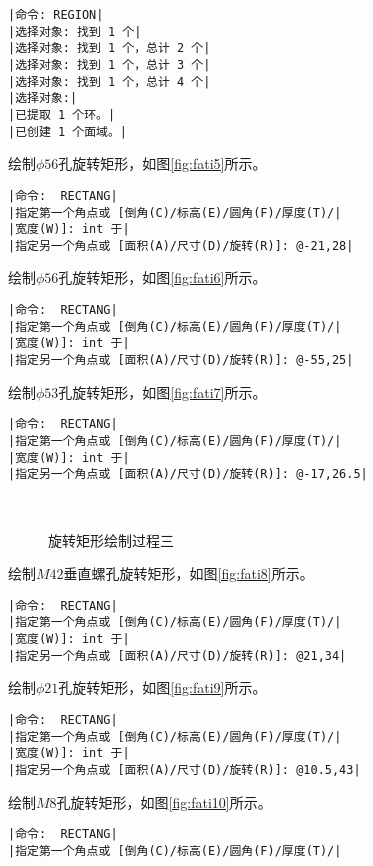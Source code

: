 \begin{procedure}
\begin{lstlisting}
|命令: REGION|
|选择对象: 找到 1 个|
|选择对象: 找到 1 个，总计 2 个|
|选择对象: 找到 1 个，总计 3 个|
|选择对象: 找到 1 个，总计 4 个|
|选择对象:|
|已提取 1 个环。|
|已创建 1 个面域。|
\end{lstlisting}
绘制$\phi 56$孔旋转矩形，如图\ref{fig:fati5}所示。
\begin{lstlisting}
|命令:  RECTANG|
|指定第一个角点或 [倒角(C)/标高(E)/圆角(F)/厚度(T)/|
|宽度(W)]: int 于|
|指定另一个角点或 [面积(A)/尺寸(D)/旋转(R)]: @-21,28|
\end{lstlisting}
绘制$\phi 56$孔旋转矩形，如图\ref{fig:fati6}所示。
\begin{lstlisting}
|命令:  RECTANG|
|指定第一个角点或 [倒角(C)/标高(E)/圆角(F)/厚度(T)/|
|宽度(W)]: int 于|
|指定另一个角点或 [面积(A)/尺寸(D)/旋转(R)]: @-55,25|
\end{lstlisting}
绘制$\phi 53$孔旋转矩形，如图\ref{fig:fati7}所示。
\begin{lstlisting}
|命令:  RECTANG|
|指定第一个角点或 [倒角(C)/标高(E)/圆角(F)/厚度(T)/|
|宽度(W)]: int 于|
|指定另一个角点或 [面积(A)/尺寸(D)/旋转(R)]: @-17,26.5|
\end{lstlisting}
\begin{figure}[htbp]
\centering
{}\hspace{30pt}
\\
\hspace{30pt}
\caption{旋转矩形绘制过程三}
\end{figure}
绘制$M42$垂直螺孔旋转矩形，如图\ref{fig:fati8}所示。
\begin{lstlisting}
|命令:  RECTANG|
|指定第一个角点或 [倒角(C)/标高(E)/圆角(F)/厚度(T)/|
|宽度(W)]: int 于|
|指定另一个角点或 [面积(A)/尺寸(D)/旋转(R)]: @21,34|
\end{lstlisting}
绘制$\phi 21$孔旋转矩形，如图\ref{fig:fati9}所示。
\begin{lstlisting}
|命令:  RECTANG|
|指定第一个角点或 [倒角(C)/标高(E)/圆角(F)/厚度(T)/|
|宽度(W)]: int 于|
|指定另一个角点或 [面积(A)/尺寸(D)/旋转(R)]: @10.5,43|
\end{lstlisting}
绘制$M8$孔旋转矩形，如图\ref{fig:fati10}所示。
\begin{lstlisting}
|命令:  RECTANG|
|指定第一个角点或 [倒角(C)/标高(E)/圆角(F)/厚度(T)/|

\end{lstlisting}
\end{procedure}
